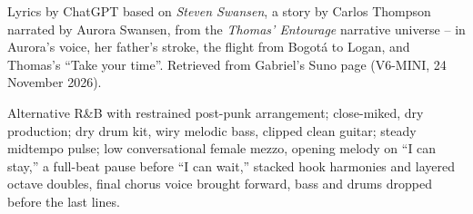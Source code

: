 
\begin{notes}
Lyrics by ChatGPT based on \emph{Steven Swansen}, a story by Carlos Thompson narrated by Aurora Swansen, from the \emph{Thomas' Entourage} narrative universe -- in Aurora's voice, her father's stroke, the flight from Bogotá to Logan, and Thomas's ``Take your time''. Retrieved from Gabriel's Suno page (V6-MINI, 24 November 2026).
\end{notes}
\begin{style}
Alternative R\&B with restrained post-punk arrangement; close-miked, dry production; dry drum kit, wiry melodic bass, clipped clean guitar; steady midtempo pulse; low conversational female mezzo, opening melody on “I can stay,” a full-beat pause before “I can wait,” stacked hook harmonies and layered octave doubles, final chorus voice brought forward, bass and drums dropped before the last lines.
\end{style}
